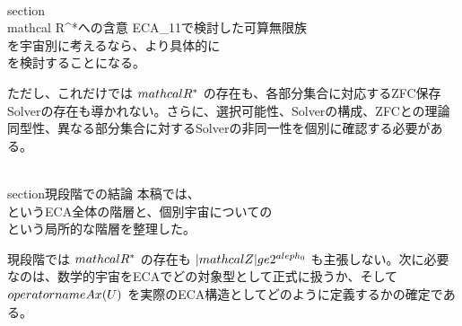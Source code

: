 \documentclass[11pt,a4paper]{article}
\begin{document}
\\section{\\mathcal R^*への含意}
ECA_11で検討した可算無限族
\\[
\\mathcal R^*=\\{r_0,r_1,r_2,\\ldots\\}\\subseteq\\Ax
\\]
を宇宙別に考えるなら、より具体的に
\\[
\\boxed{\\mathcal R^*\\subseteq\\operatorname{Ax}(U)\\subseteq\\Ax}
\\]
を検討することになる。

ただし、これだけでは $\\mathcal R^*$ の存在も、各部分集合に対応するZFC保存Solverの存在も導かれない。さらに、選択可能性、Solverの構成、ZFCとの理論同型性、異なる部分集合に対するSolverの非同一性を個別に確認する必要がある。

\\section{現段階での結論}
本稿では、
\\[
\\boxed{\\mathfrak U_{\\mathrm{ECA}}\\to\\Ax\\to I\\to\\Solver_I\\to\\mathcal Z}
\\]
というECA全体の階層と、個別宇宙についての
\\[
\\boxed{U\\to\\operatorname{Ax}(U)\\to I(U)\\to\\Solver(U)}
\\]
という局所的な階層を整理した。

現段階では $\\mathcal R^*$ の存在も $|\\mathcal Z|\\ge2^{\\aleph_0}$ も主張しない。次に必要なのは、数学的宇宙をECAでどの対象型として正式に扱うか、そして $\\operatorname{Ax}(U)$ を実際のECA構造としてどのように定義するかの確定である。

\
\end{document}
